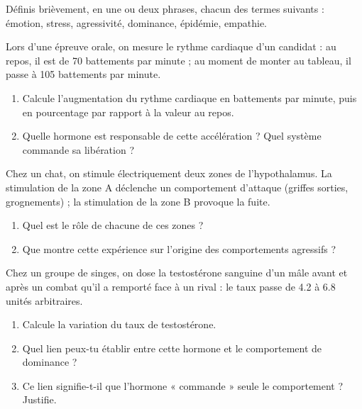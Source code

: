 \documentclass[11pt]{article}
\newcommand{\cle}[1]{{\popxbold\color{popdark}#1}}
\newcounter{popsec}
\newcounter{popsub}
\newcommand{\courssub}[1]{%
  \stepcounter{popsub}%
  \par\vspace{9pt}\noindent{\popxbold\fontsize{11.5}{13}\selectfont\color{popink}{\color{poporange}\thepopsec.\thepopsub}\hspace{6pt}#1}\par\nopagebreak\vspace{4pt}
}
\begin{document}
\begin{exercice}[Définitions]
Définis brièvement, en une ou deux phrases, chacun des termes suivants : \cle{émotion}, \cle{stress}, \cle{agressivité}, \cle{dominance}, \cle{épidémie}, \cle{empathie}.
\end{exercice}

\begin{exercice}
Lors d'une épreuve orale, on mesure le rythme cardiaque d'un candidat : au repos, il est de 70 battements par minute ; au moment de monter au tableau, il passe à 105 battements par minute.
\begin{enumerate}
\item Calcule l'augmentation du rythme cardiaque en battements par minute, puis en pourcentage par rapport à la valeur au repos.
\item Quelle hormone est responsable de cette accélération ? Quel système commande sa libération ?
\end{enumerate}
\end{exercice}

\courssub{Je m'entraîne}

\begin{exercice}
Chez un chat, on stimule électriquement deux zones de l'hypothalamus. La stimulation de la zone A déclenche un comportement d'attaque (griffes sorties, grognements) ; la stimulation de la zone B provoque la fuite.
\begin{enumerate}
\item Quel est le rôle de chacune de ces zones ?
\item Que montre cette expérience sur l'origine des comportements agressifs ?
\end{enumerate}
\end{exercice}

\begin{exercice}
Chez un groupe de singes, on dose la testostérone sanguine d'un mâle avant et après un combat qu'il a remporté face à un rival : le taux passe de \num{4,2} à \num{6,8} unités arbitraires.
\begin{enumerate}
\item Calcule la variation du taux de testostérone.
\item Quel lien peux-tu établir entre cette hormone et le comportement de dominance ?
\item Ce lien signifie-t-il que l'hormone « commande » seule le comportement ? Justifie.
\end{enumerate}
\end{exercice}
\end{document}
